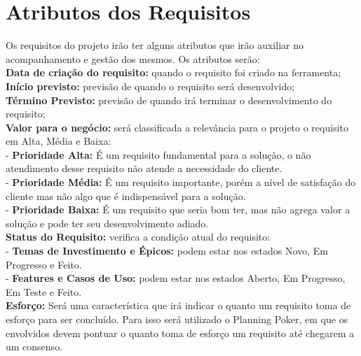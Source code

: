 \section{Atributos dos Requisitos}
Os requisitos do projeto irão ter alguns atributos que irão auxiliar no acompanhamento e gestão dos mesmos. Os atributos serão:\\
\tab \textbf{Data de criação do requisito:} quando o requisito foi criado na ferramenta;\\
\tab \textbf{Início previsto:} previsão de quando o requisito será desenvolvido;\\
\tab \textbf{Término Previsto:} previsão de quando irá terminar o desenvolvimento do requisito;\\
\tab \textbf{Valor para o negócio:} será classificada a relevância para o projeto o requisito em Alta, Média e Baixa:\\
\tab - \textbf{Prioridade Alta:} É um requisito fundamental para a solução, o não atendimento desse requisito não atende a necessidade do cliente.\\
\tab - \textbf{Prioridade Média:} É um requisito importante, porém a nível de satisfação do cliente mas não algo que é indispensável para a solução.\\
\tab - \textbf{Prioridade Baixa:} É um requisito que seria bom ter, mas não agrega valor a solução e pode ter seu desenvolvimento adiado.\\
\tab \textbf{Status do Requisito:} verifica a condição atual do requisito:\\
\tab - \textbf{Temas de Investimento e Épicos:} podem estar nos estados Novo, Em Progresso e Feito.\\
\tab - \textbf{Features e Casos de Uso:} podem estar nos estados Aberto, Em Progresso, Em Teste e Feito.\\
\tab \textbf{Esforço:} Será uma característica que irá indicar o quanto um requisito toma de esforço para ser concluído. Para isso será utilizado o Planning Poker, em que os envolvidos devem pontuar o quanto toma de esforço um requisito até chegarem a um consenso.\\
